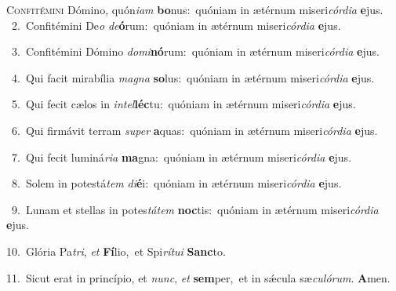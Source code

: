 \lettrine{\initial\textcolor{\initialcolor}{C}}{onfitémini} Dómino, quón\-\textit{i}\-\textit{am} \textbf{bo}\-nus:~\star quóniam in ætérnum miseri\-\textit{cór}\-\textit{di}\textit{a} \textbf{e}\-jus.\\
{\numbfont\textcolor{\numbcolor}{~2.}}~Confitémini De\textit{o} \textit{de}\-\textbf{ó}rum:~\star quóniam in ætérnum miseri\-\textit{cór}\-\textit{di}\textit{a} \textbf{e}\-jus.\par
{\numbfont\textcolor{\numbcolor}{~3.}}~Confitémini Dómino \textit{do}\-\textit{mi}\textbf{nó}rum:~\star quóniam in ætérnum miseri\-\textit{cór}\-\textit{di}\textit{a} \textbf{e}\-jus.\par
{\numbfont\textcolor{\numbcolor}{~4.}}~Qui facit mirabília \textit{ma}\-\textit{gna} \textbf{so}\-lus:~\star quóniam in ætérnum miseri\-\textit{cór}\-\textit{di}\textit{a} \textbf{e}\-jus.\par
{\numbfont\textcolor{\numbcolor}{~5.}}~Qui fecit cælos in \textit{in}\-\textit{tel}\textbf{léc}tu:~\star quóniam in ætérnum miseri\-\textit{cór}\-\textit{di}\textit{a} \textbf{e}\-jus.\par
{\numbfont\textcolor{\numbcolor}{~6.}}~Qui firmávit terram \textit{su}\-\textit{per} \textbf{a}\-quas:~\star quóniam in ætérnum miseri\-\textit{cór}\-\textit{di}\textit{a} \textbf{e}\-jus.\par
{\numbfont\textcolor{\numbcolor}{~7.}}~Qui fecit luminá\-\textit{ri}\-\textit{a} \textbf{ma}\-gna:~\star quóniam in ætérnum miseri\-\textit{cór}\-\textit{di}\textit{a} \textbf{e}\-jus.\par
{\numbfont\textcolor{\numbcolor}{~8.}}~Solem in potestá\textit{tem} \textit{di}\-\textbf{é}i:~\star quóniam in ætérnum miseri\-\textit{cór}\-\textit{di}\textit{a} \textbf{e}\-jus.\par
{\numbfont\textcolor{\numbcolor}{~9.}}~Lunam et stellas in potes\-\textit{tá}\-\textit{tem} \textbf{noc}\-tis:~\star quóniam in ætérnum miseri\-\textit{cór}\-\textit{di}\textit{a} \textbf{e}\-jus.\par
{\numbfont\textcolor{\numbcolor}{10.}}~Glória Pa\-\textit{tri}\-, \textit{et} \textbf{Fí}\-lio,~\star et Spi\-\textit{rí}\-\textit{tu}\textit{i} \textbf{Sanc}\-to.\par
{\numbfont\textcolor{\numbcolor}{11.}}~Sicut erat in princípio, et \textit{nunc}\-, \textit{et} \textbf{sem}\-per,~\star et in sǽcula sæ\-\textit{cu}\-\textit{ló}\textit{rum}. \textbf{A}\-men.\par
